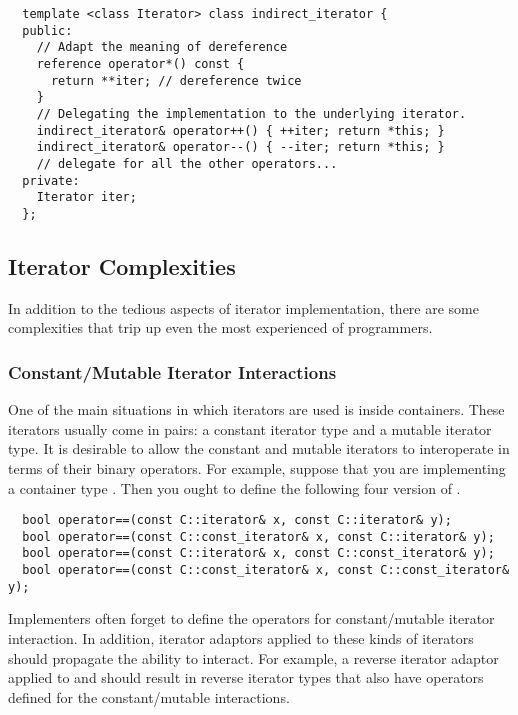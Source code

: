 \documentclass{netobjectdays}
\begin{document}
{\footnotesize
\begin{verbatim}
  template <class Iterator> class indirect_iterator {
  public:
    // Adapt the meaning of dereference
    reference operator*() const {
      return **iter; // dereference twice
    }
    // Delegating the implementation to the underlying iterator.
    indirect_iterator& operator++() { ++iter; return *this; }
    indirect_iterator& operator--() { --iter; return *this; }
    // delegate for all the other operators...
  private:
    Iterator iter;
  };
\end{verbatim}
}

\subsection{Iterator Complexities}

In addition to the tedious aspects of iterator implementation, there
are some complexities that trip up even the most experienced of
programmers.

\subsubsection{Constant/Mutable Iterator Interactions}

One of the main situations in which iterators are used is inside
containers. These iterators usually come in pairs: a constant iterator
type and a mutable iterator type. It is desirable to allow the
constant and mutable iterators to interoperate in terms of their
binary operators. For example, suppose that you are implementing a
container type . Then you ought to define the following four
version of .

{\footnotesize
\begin{verbatim}
  bool operator==(const C::iterator& x, const C::iterator& y);
  bool operator==(const C::const_iterator& x, const C::iterator& y);
  bool operator==(const C::iterator& x, const C::const_iterator& y);
  bool operator==(const C::const_iterator& x, const C::const_iterator& y);
\end{verbatim}
}

Implementers often forget to define the operators for constant/mutable
iterator interaction. In addition, iterator adaptors applied to these
kinds of iterators should propagate the ability to interact. For
example, a reverse iterator adaptor applied to  and
 should result in reverse iterator types that
also have operators defined for the constant/mutable interactions.
\end{document}
